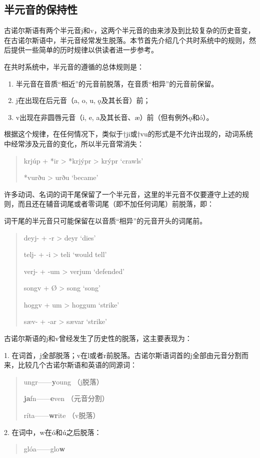 \subsection{半元音的保持性}
\label{半元音的保持性}

古诺尔斯语有两个半元音j和v，这两个半元音的由来涉及到比较复杂的历史音变，在古诺尔斯语中，半元音经常发生脱落。本节首先介绍几个共时系统中的规则，然后提供一些简单的历时规律以供读者进一步参考。

在共时系统中，半元音的遵循的总体规则是：

\begin{info}
  \begin{enumerate}
    \item 半元音在音质``相近''的元音前脱落，在音质``相异''的元音前保留。
    \item j在出现在后元音（a, o, u, ǫ及其长音）前；
    \item v出现在非圆唇元音（i, e, a及其长音、æ）前（但有例外ǫ和ó）。
  \end{enumerate}
\end{info}

根据这个规律，在任何情况下，类似于†ji或†vu的形式是不允许出现的，动词系统中经常涉及元音的变化，所以半元音常消失：

\begin{quote}
  krjúp + *ir > *krjýpr > krýpr `crawls'

  *vurðu > urðu `became'
\end{quote}

许多动词、名词的词干尾保留了一个半元音，这里的半元音不仅要遵守上述的规则，而且还在辅音词尾或者零词尾（即不加任何词尾）前脱落，即：

\begin{info}
  词干尾的半元音只可能保留在以音质``相异''的元音开头的词尾前。
\end{info}

\begin{quote}
  deyj- + -r > deyr `dies'

  telj- + -i > teli `would tell'

  verj- + -um > verjum `defended'

  songv + Ø > song `song'

  hoggv + um > hoggum `strike'

  sæv- + -ar > sævar `strike'
\end{quote}

古诺尔斯语的j和v曾经发生了历史性的脱落，这主要表现为：

1.
在词首，j全部脱落；v在l或者r前脱落。古诺尔斯语词首的j全部由元音分割而来，比较几个古诺尔斯语和英语的同源词：

\begin{quote}
  ungr------\textbf{y}oung （j脱落）

  \textbf{ja}fn------\textbf{e}ven （元音分割）

  ríta------\textbf{wr}ite （v脱落）
\end{quote}

2. 在词中，w在ó和ú之后脱落：

\begin{quote}
  glóa------glo\textbf{w}
\end{quote}






